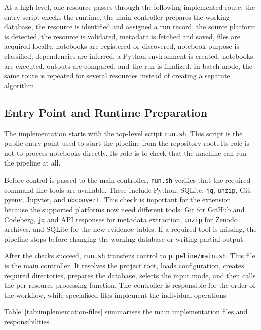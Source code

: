 At a high level, one resource passes through the following implemented route: the entry script checks the runtime, the main controller prepares the working database, the resource is identified and assigned a run record, the source platform is detected, the resource is validated, metadata is fetched and saved, files are acquired locally, notebooks are registered or discovered, notebook purpose is classified, dependencies are inferred, a Python environment is created, notebooks are executed, outputs are compared, and the run is finalized. In batch mode, the same route is repeated for several resources instead of creating a separate algorithm.

\subsection{Entry Point and Runtime Preparation}

The implementation starts with the top-level script \texttt{run.sh}. This script is the public entry point used to start the pipeline from the repository root. Its role is not to process notebooks directly. Its role is to check that the machine can run the pipeline at all.

Before control is passed to the main controller, \texttt{run.sh} verifies that the required command-line tools are available. These include Python, SQLite, \texttt{jq}, \texttt{unzip}, Git, pyenv, Jupyter, and \texttt{nbconvert}. This check is important for the extension because the supported platforms now need different tools: Git for GitHub and Codeberg, \texttt{jq} and API responses for metadata extraction, \texttt{unzip} for Zenodo archives, and SQLite for the new evidence tables. If a required tool is missing, the pipeline stops before changing the working database or writing partial output.

After the checks succeed, \texttt{run.sh} transfers control to \texttt{pipeline/main.sh}. This file is the main controller. It resolves the project root, loads configuration, creates required directories, prepares the database, selects the input mode, and then calls the per-resource processing function. The controller is responsible for the order of the workflow, while specialised files implement the individual operations.

Table~\ref{tab:implementation-files} summarises the main implementation files and responsibilities.

